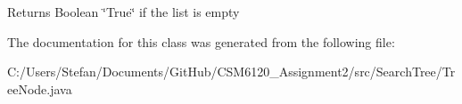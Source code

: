 \begin{DoxyReturn}{Returns}
Boolean \char`\"{}\+True\char`\"{} if the list is empty 
\end{DoxyReturn}


The documentation for this class was generated from the following file\+:\begin{DoxyCompactItemize}
\item 
C\+:/\+Users/\+Stefan/\+Documents/\+Git\+Hub/\+C\+S\+M6120\+\_\+\+Assignment2/src/\+Search\+Tree/Tree\+Node.\+java\end{DoxyCompactItemize}
